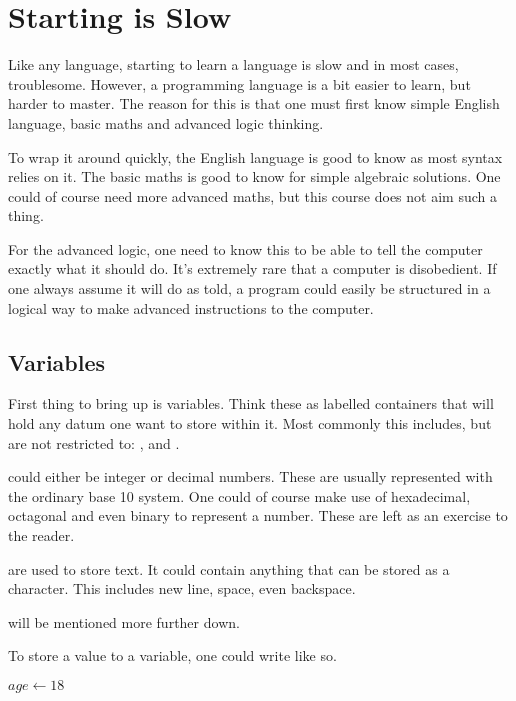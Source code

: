 \section{Starting is Slow}

Like any language, starting to learn a language is slow and in most cases, troublesome. However, a programming language is a bit easier to learn, but harder to master. The reason for this is that one must first know simple English language, basic maths and advanced logic thinking.

To wrap it around quickly, the English language is good to know as most syntax relies on it. The basic maths is good to know for simple algebraic solutions. One could of course need more advanced maths, but this course does not aim such a thing.

For the advanced logic, one need to know this to be able to tell the computer exactly what it should do. It’s extremely rare that a computer is disobedient. If one always assume it will do as told, a program could easily be structured in a logical way to make advanced instructions to the computer.

\subsection{Variables}

First thing to bring up is variables. Think these as labelled containers that will hold any datum one want to store within it. Most commonly this includes, but are not restricted to: ,  and .

 could either be integer or decimal numbers. These are usually represented with the ordinary base 10 system. One could of course make use of hexadecimal, octagonal and even binary to represent a number. These are left as an exercise to the reader.

 are used to store text. It could contain anything that can be stored as a character. This includes new line, space, even backspace.

 will be mentioned more further down.

To store a value to a variable, one could write like so.

\begin{algorithm}[H]
	\begin{algorithmic}[1]
		\State $age \gets 18$
	\end{algorithmic}
\end{algorithm}

